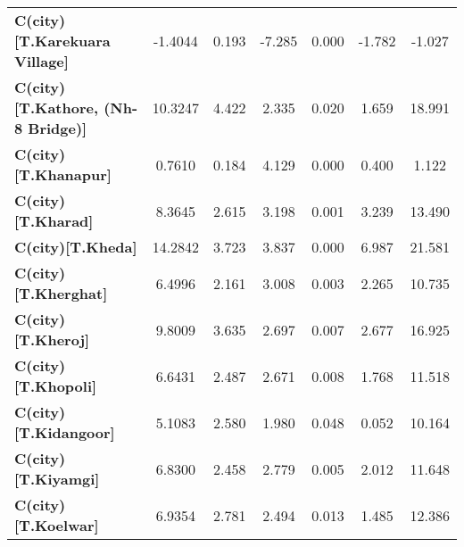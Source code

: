 \begin{center}
\begin{tabular}{lcccccc}
\textbf{C(city)[T.Karekuara Village]}                                                               &      -1.4044  &        0.193     &    -7.285  &         0.000        &       -1.782    &       -1.027     \\
\textbf{C(city)[T.Kathore, (Nh-8 Bridge)]}                                                          &      10.3247  &        4.422     &     2.335  &         0.020        &        1.659    &       18.991     \\
\textbf{C(city)[T.Khanapur]}                                                                        &       0.7610  &        0.184     &     4.129  &         0.000        &        0.400    &        1.122     \\
\textbf{C(city)[T.Kharad]}                                                                          &       8.3645  &        2.615     &     3.198  &         0.001        &        3.239    &       13.490     \\
\textbf{C(city)[T.Kheda]}                                                                           &      14.2842  &        3.723     &     3.837  &         0.000        &        6.987    &       21.581     \\
\textbf{C(city)[T.Kherghat]}                                                                        &       6.4996  &        2.161     &     3.008  &         0.003        &        2.265    &       10.735     \\
\textbf{C(city)[T.Kheroj]}                                                                          &       9.8009  &        3.635     &     2.697  &         0.007        &        2.677    &       16.925     \\
\textbf{C(city)[T.Khopoli]}                                                                         &       6.6431  &        2.487     &     2.671  &         0.008        &        1.768    &       11.518     \\
\textbf{C(city)[T.Kidangoor]}                                                                       &       5.1083  &        2.580     &     1.980  &         0.048        &        0.052    &       10.164     \\
\textbf{C(city)[T.Kiyamgi]}                                                                         &       6.8300  &        2.458     &     2.779  &         0.005        &        2.012    &       11.648     \\
\textbf{C(city)[T.Koelwar]}                                                                         &       6.9354  &        2.781     &     2.494  &         0.013        &        1.485    &       12.386     \\

\end{tabular}
\end{center}
